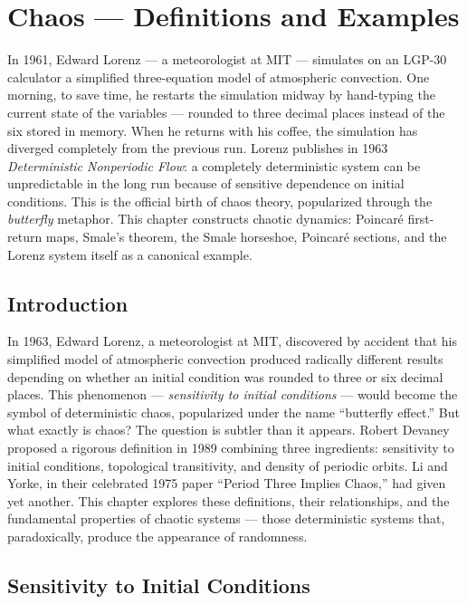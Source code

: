 \chapter{Chaos --- Definitions and Examples}
\label{ch:chaos}

In 1961, Edward Lorenz --- a meteorologist at MIT --- simulates on an LGP-30 calculator a simplified three-equation model of atmospheric convection. One morning, to save time, he restarts the simulation midway by hand-typing the current state of the variables --- rounded to three decimal places instead of the six stored in memory. When he returns with his coffee, the simulation has diverged completely from the previous run. Lorenz publishes in 1963 \emph{Deterministic Nonperiodic Flow}: a completely deterministic system can be unpredictable in the long run because of sensitive dependence on initial conditions. This is the official birth of chaos theory, popularized through the \emph{butterfly} metaphor. This chapter constructs chaotic dynamics: Poincaré first-return maps, Smale's theorem, the Smale horseshoe, Poincaré sections, and the Lorenz system itself as a canonical example.

\section{Introduction}

In 1963, Edward Lorenz, a meteorologist at MIT, discovered by accident that his simplified model of atmospheric convection produced radically different results depending on whether an initial condition was rounded to three or six decimal places. This phenomenon --- \emph{sensitivity to initial conditions} --- would become the symbol of deterministic chaos, popularized under the name ``butterfly effect.'' But what exactly is chaos? The question is subtler than it appears. Robert Devaney proposed a rigorous definition in 1989 combining three ingredients: sensitivity to initial conditions, topological transitivity, and density of periodic orbits. Li and Yorke, in their celebrated 1975 paper ``Period Three Implies Chaos,'' had given yet another. This chapter explores these definitions, their relationships, and the fundamental properties of chaotic systems --- those deterministic systems that, paradoxically, produce the appearance of randomness.

\section{Sensitivity to Initial Conditions}

